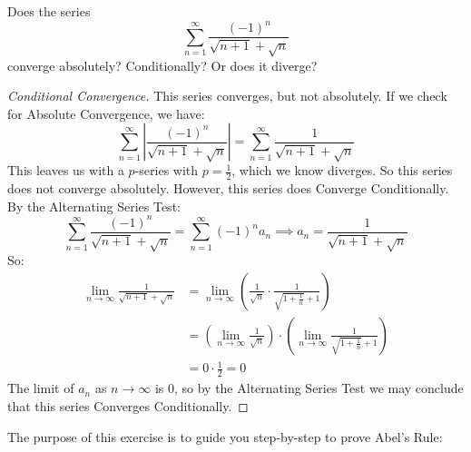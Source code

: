 \documentclass{article}
\begin{document}
	\item Does the series $$\sum_{n=1}^\infty \frac{(-1)^n}{\sqrt{n+1} + \sqrt{n}}$$ converge absolutely? Conditionally? Or does it diverge?
	\begin{proof}[Conditional Convergence]
	This series converges, but not absolutely. If we check for Absolute Convergence, we have:
	$$\sum_{n=1}^\infty \left\vert\frac{(-1)^n}{\sqrt{n+1} + \sqrt{n}}\right\vert  = \sum_{n=1}^\infty \frac{1}{\sqrt{n+1} + \sqrt{n}}$$
	This leaves us with a $p$-series with $p=\frac{1}{2}$, which we know diverges. So this series does not converge absolutely. However, this series does Converge Conditionally.\\
	By the Alternating Series Test:
	$$\sum_{n=1}^\infty \frac{(-1)^n}{\sqrt{n+1} + \sqrt{n}} = \sum_{n=1}^\infty (-1)^n a_n \implies a_n = \frac{1}{\sqrt{n+1} + \sqrt{n}}$$
	So:
	\begin{align*}
	\lim_{n\to\infty}\frac{1}{\sqrt{n+1} + \sqrt{n}} &= \lim_{n\to\infty}\left(\frac{1}{\sqrt{n}}\cdot\frac{1}{\sqrt{1+\frac{1}{n}} + 1}\right)\\
	&= \left(\lim_{n\to\infty}\frac{1}{\sqrt{n}}\right)\cdot\left(\lim_{n\to\infty}\frac{1}{\sqrt{1+\frac{1}{n}} + 1}\right)\\
	&= 0\cdot\frac{1}{2} = 0
	\end{align*}
	The limit of $a_n$ as $n\to\infty$ is 0, so by the Alternating Series Test we may conclude that this series Converges Conditionally.
	\end{proof}
	
	\item The purpose of this exercise is to guide you step-by-step to prove Abel's Rule:
\end{document}
